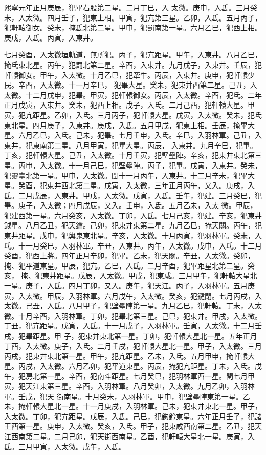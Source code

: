 \begin{pinyinscope}
 熙寧元年正月庚辰，犯畢右股第二星。二月丁巳，入
 太微。庚申，入氐。三月癸未，入太微。四月壬子，犯東上相。甲寅，犯亢第三星。乙卯，入氐。五月丙子，犯軒轅御女。癸未，掩氐北第二星。甲申，犯罰南第一星。六月乙巳，犯西上相。庚戌，入氐。丙寅，入東井。



 七月癸酉，入太微垣軌道，無所犯。丙子，犯亢距星。甲午，入東井。八月乙巳，掩氐東北星。丙午，犯罰北第二星。辛酉，入東井。九月戊子，入東井。壬辰，犯軒轅御女。甲午，入太微。十月乙巳，犯牽牛。丙辰，入東井。庚申，犯軒轅少民。辛酉，入太微。十一月辛巳，
 犯畢大星。癸未，犯東井西第二星。己丑，入太微。十二月戊申，犯畢。甲寅，犯軒轅御女。丙辰，入太微。辛酉，犯氐。二年正月戊寅，入東井。癸未，犯西上相。戊子，入氐。二月己酉，犯軒轅大星。甲寅，犯亢距星。乙卯，入氐。三月丙子，犯軒轅大星。戊寅，入太微。癸未，犯氐東北星。四月庚子，入東井。庚戌，入氐。五月甲戌，犯東上相。壬辰，掩畢大星。六月乙巳，入氐。己未，犯畢。七月壬申，入氐。辛巳，入羽林軍。己丑，入東井，犯東南第二星。八月甲寅，犯畢大星。丙辰，
 入東井。九月辛巳，犯畢。丁亥，犯軒轅大星。己丑，入太微。十月壬寅，犯壁壘陣。辛亥，犯東井東北第三星。丙申，入太微。十一月己巳，犯壁壘陣。丙子，犯畢。戊寅，入東井。癸未，犯靈臺北第一星。甲申，入太微。閏十一月丙午，入東井。十二月辛未，犯畢大星。癸酉，犯東井西北第二星。戊寅，入太微，三年正月丙午，又入。庚戌，入氐。二月戊辰，入東井。甲戌，入太微。戊寅，入氐。壬午，犯建。三月癸巳，犯畢。庚子，入太微；四月戊辰，又入。壬申，入氐。五月乙未，入太
 微。甲辰，犯建西第一星。六月癸亥，入太微。丁卯，入氐。七月己亥，犯建。辛亥，犯東井鉞星。八月乙丑，犯天鑰。己卯，犯東井東第二星。九月乙巳，掩天關。丙午，犯東井距星。戊申，犯輿鬼東北星。辛亥，入太微。十月丙寅，犯羽林軍。癸未，入氐。十一月癸巳，入羽林軍。辛丑，入東井。丙午，入太微。戊申，入氐。十二月癸酉，犯西上將。四年正月辛卯，犯畢。乙未，犯天關。辛丑，入太微。癸卯，掩、犯平道東星。甲辰，犯亢。乙巳，入氐。二月辛酉，犯畢距星北第二星。癸亥，
 掩、犯東井距星。戊辰，入太微。甲戌，犯東咸。三月甲午，犯軒轅大星北一星。庚子，入氐。四月丁卯，又入。庚午，犯天江。丙子，入羽林軍。五月庚寅，入太微。甲辰，入羽林軍。六月戊午，入太微。癸亥，犯鍵閉。七月丙戌，入太微。己丑，入氐。八月甲子，犯壁壘陣第一星。九月乙巳，犯軒轅。丁未，入太微。十月辛酉，入羽林軍。丁卯，犯畢北第三星。己巳，犯東井。甲戌，入太微。丁丑，犯亢距星。戊寅，入氐。十一月戊子，入羽林軍。壬寅，入太微。十二月壬戌，犯畢距星。甲
 子，犯東井東北第一星。丁卯，犯軒轅大星北一星。五年正月丁酉，入太微。庚子，入氐。二月壬戌，犯軒轅大星北一星。甲子，入太微。三月丙戌，犯東井東北第一星。甲午，犯亢距星。乙未，入氐。五月甲申，掩軒轅大星。丙戌，入太微。六月乙卯，犯平道東星。丙辰，掩犯亢距星。丁未，入氐。戊午，犯房北第一星。辛酉，犯南斗距星。七月癸巳，犯羽林軍西一星。閏七月甲寅，犯天江東第三星。辛酉，入羽林軍。八月癸卯，入太微。九月乙卯，入羽林軍。壬戌，犯天
 街南星。十月癸未，入羽林軍。甲申，犯壁壘陣東第一星。乙未，掩軒轅大星北一星。十一月庚戌，入羽林軍。己未，犯東井東北一星。甲子，入太微。丁卯，犯亢距星。戊辰，入氐。己巳，犯鉤鈐東星。六年正月壬子，犯諸王西第一星。庚申，入太微。癸亥，入氐。甲子，犯東咸西南第二星。乙丑，犯天江西南第二星。二月己卯，犯天街西南星。乙酉，犯軒轅大星北一星。庚寅，入氐。三月甲寅，入太微。戊午，入氐。




\end{pinyinscope}

